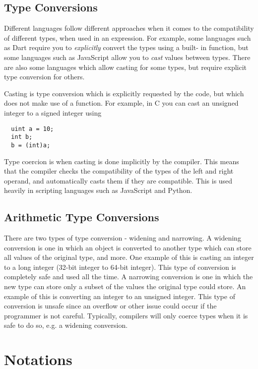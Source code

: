 \subsection*{Type Conversions}

Different languages follow different approaches when it comes to the compatibility of different types, when used in an
 expression. For example, some languages such as Dart require you to \textit{explicitly} convert the types using a built-
in function, but some languages such as JavaScript allow you to \textit{cast} values between types. There are also some
 languages which allow casting for some types, but require explicit type conversion for others.

Casting is type conversion which is explicitly requested by the code, but which does not make use of a function. For
 example, in C you can cast an unsigned integer to a signed integer using
\begin{verbatim}
  uint a = 10;
  int b;
  b = (int)a;
\end{verbatim}

Type coercion is when casting is done implicitly by the compiler. This means that the compiler checks the compatibility
 of the types of the left and right operand, and automatically casts them if they are compatible. This is used heavily
 in scripting languages such as JavaScript and Python.

\subsection*{Arithmetic Type Conversions}

There are two types of type conversion - widening and narrowing. A widening conversion is one in which an object is
 converted to another type which can store all values of the original type, and more. One example of this is casting
 an integer to a long integer (32-bit integer to 64-bit integer). This type of conversion is completely safe and used
 all the time. A narrowing conversion is one in which the new type can store only a subset of the values the original
 type could store. An example of this is converting an integer to an unsigned integer. This type of conversion is unsafe
 since an overflow or other issue could occur if the programmer is not careful. Typically, compilers will only coerce
 types when it is safe to do so, e.g. a widening conversion.

\section*{Notations}

